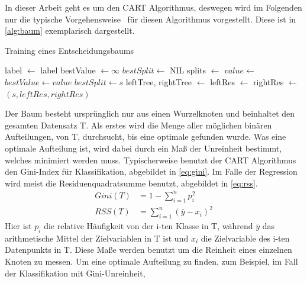 In dieser Arbeit geht es um den CART Algorithmus, deswegen wird im Folgenden
nur die typische Vorgehensweise~\cite{CRAWFORD1989197} für diesen Algorithmus vorgestellt.
Diese ist in \cref{alg:baum} exemplarisch dargestellt.
\begin{algorithm}
  \caption{Training eines Entscheidungsbaums}%
  \label{alg:baum}
  \begin{algorithmic}[1]
        \State label \(\gets\) 
        \State \Return label
      \EndIf
      \State bestValue \(\gets \infty\)
      \State \(\mathit{bestSplit} \gets \) NIL
      \State splits \(\gets\) 
        \State \(\mathit{value} \gets \) 
          \State \(\mathit{bestValue} \gets \mathit{value}\)
          \State \(\mathit{bestSplit} \gets s\)
        \EndIf
      \EndFor
      \State leftTree, rightTree \(\gets\) 
      \State leftRes \(\gets\) 
      \State rightRes \(\gets\) 
      \State \Return \((s, leftRes, rightRes)\)
    \EndFunction
  \end{algorithmic}
\end{algorithm}
Der Baum besteht ursprünglich nur aus einen Wurzelknoten und beinhaltet den gesamten Datensatz T.
Als erstes wird die Menge aller möglichen binären Aufteilungen, von T, durchsucht, bis eine optimale
gefunden wurde. Was eine optimale Aufteilung ist, wird dabei durch ein Maß der Unreinheit bestimmt, welches minimiert
werden muss. Typischerweise benutzt der CART Algorithmus den Gini-Index für Klassifikation, abgebildet in \cref{eq:gini}.
Im Falle der Regression wird meist die Residuenquadratsumme benutzt, abgebildet in \cref{eq:rss}.
\begin{align}
    Gini(T)       & = 1 - \sum_{i=1}^n p_i^2 \label{eq:gini} \\
    \mathit{RSS}(T)       & = \sum_{i=1}^n (\bar{y} - x_i)^2 \label{eq:rss} 
  \end{align}
Hier ist \(p_i\) die relative Häufigkeit von der i-ten Klasse in T, während \(\bar{y}\) das arithmetische Mittel der Zielvariablen
in T ist und \(x_i\) die Zielvariable des i-ten Datenpunkts in T.
Diese Maße werden benutzt um die Reinheit eines einzelnen Knoten zu messen.
Um eine optimale Aufteilung zu finden, zum Beispiel, im Fall der Klassifikation mit Gini-Unreinheit,
